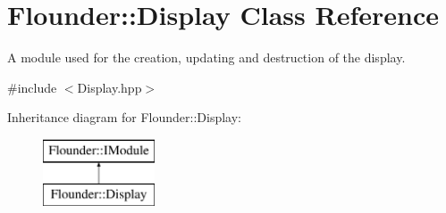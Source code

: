 \hypertarget{class_flounder_1_1_display}{}\section{Flounder\+:\+:Display Class Reference}
\label{class_flounder_1_1_display}


A module used for the creation, updating and destruction of the display.  




{\ttfamily \#include $<$Display.\+hpp$>$}

Inheritance diagram for Flounder\+:\+:Display\+:\begin{figure}[H]
\begin{center}
\leavevmode
\includegraphics[height=2.000000cm]{class_flounder_1_1_display}
\end{center}
\end{figure}
